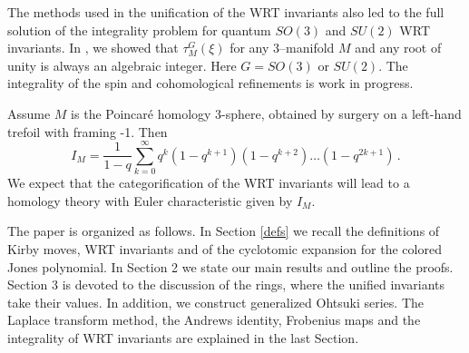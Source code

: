 \documentclass[12pt]{amsart}
\theoremstyle{plain}
\theoremstyle{definition}
\newcommand{\ord}{\operatorname{ord}}
\begin{document}
The methods used in the unification
of the WRT invariants  also led to the full solution of
the integrality problem for quantum $SO(3)$ and $SU(2)$ WRT invariants.
In \cite{BL,BCL}, we showed that
$\tau_M^G(\xi)$ for any 3--manifold $M$ and any root of unity
is always an algebraic integer. Here $G=SO(3)$ or $SU(2)$.
The integrality of the  spin
and cohomological refinements is work in progress.





Assume $M$ is the Poincar\'e homology 3-sphere, obtained by surgery on a left-hand trefoil
with framing -1. Then
$$ I_M=\frac{1}{1-q} \sum^\infty_{k=0} q^k (1-q^{k+1})(1-q^{k+2})
\dots (1-q^{2k+1})\, .$$
We expect that  the categorification of
the WRT invariants will lead to  a
homology theory with  Euler characteristic given by $I_M$.





The paper is organized as follows. In Section \ref{defs} we recall
the definitions of Kirby moves,
WRT invariants and of the cyclotomic expansion for the colored Jones polynomial.
In Section 2 we state our main results and outline the proofs.
 Section 3 is
devoted to the discussion of the rings, where the unified
invariants take their values.
In addition, we construct generalized
Ohtsuki series.
The Laplace transform method, the Andrews identity, Frobenius maps
and the integrality of WRT invariants are explained in the last Section.














\end{document}
